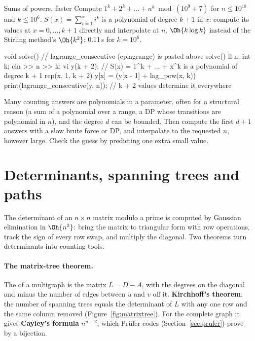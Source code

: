 
\begin{problem}{Sums of powers, faster}
Compute $1^k + 2^k + \dots + n^k \bmod (10^9 + 7)$ for $n \le 10^{18}$ and $k \le 10^6$.
\solution $S(x) = \sum_{i=1}^{x} i^k$ is a polynomial of degree $k + 1$ in $x$: compute its values at $x = 0, \dots, k + 1$ directly
and interpolate at $n$. $\Oh{k \log k}$ instead of the Stirling method's $\Oh{k^2}$: 0.11\,s for $k = 10^6$.
\end{problem}

\begin{code}
void solve() {  // lagrange_consecutive (cplagrange) is pasted above solve()
    ll n;
    int k;
    cin >> n >> k;
    vi y(k + 2);  // S(x) = 1^k + ... + x^k is a polynomial of degree k + 1
    rep(x, 1, k + 2) y[x] = (y[x - 1] + lag_pow(x, k)) %
    print(lagrange_consecutive(y, n));  // k + 2 values determine it everywhere
}
\end{code}

\begin{trick}
Many counting answers are polynomials in a parameter, often for a structural reason (a sum of a polynomial over a range, a DP whose
transitions are polynomial in $n$), and the degree $d$ can be bounded. Then compute the first $d + 1$ answers with a slow brute force or
DP, and interpolate to the requested $n$, however large. Check the guess by predicting one extra small value.
\end{trick}

\section[Determinants, spanning trees and paths]{Determinants, spanning trees and paths \hfill \ioi}\label{sec:matrixtree}

The determinant of an $n \times n$ matrix modulo a prime is computed by Gaussian elimination in $\Oh{n^3}$: bring the matrix to
triangular form with row operations, track the sign of every row swap, and multiply the diagonal. Two theorems turn determinants into
counting tools.

\paragraph{The matrix-tree theorem.} The  of a multigraph is the matrix $L = D - A$, with the degrees on the diagonal
and minus the number of edges between $u$ and $v$ off it. \textbf{Kirchhoff's theorem}: the number of spanning trees equals the
determinant of $L$ with any one row and the same column removed (Figure~\ref{fig:matrixtree}). For the complete graph it gives
\textbf{Cayley's formula} $n^{n-2}$, which Prüfer codes (Section~\ref{sec:prufer}) prove by a bijection.

